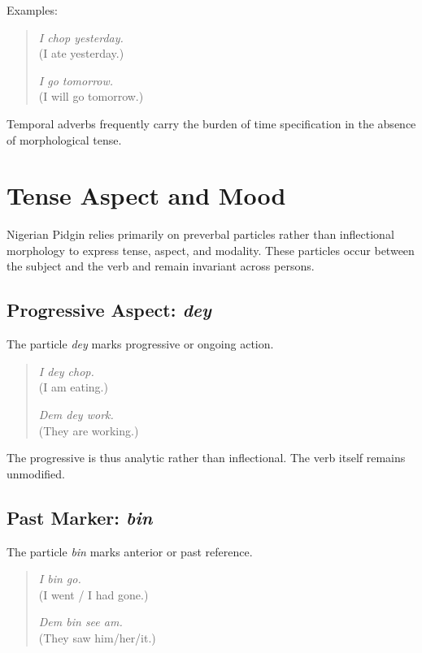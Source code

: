 \documentclass[12pt]{article}
\begin{document}
Examples:

\begin{quote}
\textit{I chop yesterday.} \\
(I ate yesterday.)

\textit{I go tomorrow.} \\
(I will go tomorrow.)
\end{quote}

Temporal adverbs frequently carry the burden of time specification in the absence of morphological tense.

\section{Tense Aspect and Mood}

Nigerian Pidgin relies primarily on preverbal particles rather than inflectional morphology to express tense, aspect, and modality. These particles occur between the subject and the verb and remain invariant across persons.

\subsection{Progressive Aspect: \textit{dey}}

The particle \textit{dey} marks progressive or ongoing action.

\begin{quote}
\textit{I dey chop.} \\
(I am eating.)

\textit{Dem dey work.} \\
(They are working.)
\end{quote}

The progressive is thus analytic rather than inflectional. The verb itself remains unmodified.

\subsection{Past Marker: \textit{bin}}

The particle \textit{bin} marks anterior or past reference.

\begin{quote}
\textit{I bin go.} \\
(I went / I had gone.)

\textit{Dem bin see am.} \\
(They saw him/her/it.)
\end{quote}
\end{document}
